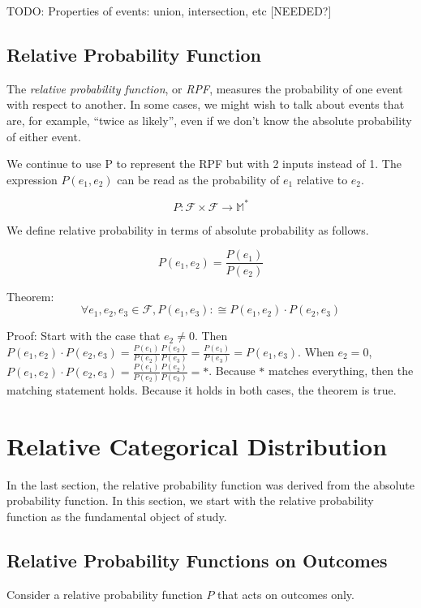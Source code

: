 \documentclass[twoside]{article}
\newcommand{\quotes}[1]{``#1''}
\begin{document}
TODO: Properties of events: union, intersection, etc [NEEDED?]

\subsection{Relative Probability Function}

The \textit{relative probability function}, or \textit{RPF}, measures the probability of one event with respect to another. In some cases, we might wish to talk about events that are, for example, \quotes{twice as likely}, even if we don't know the absolute probability of either event.

We continue to use P to represent the RPF but with 2 inputs instead of 1. The expression \(P(e_1, e_2)\) can be read as the probability of \(e_1\) relative to \(e_2\).

\[P: \mathcal{F} \times \mathcal{F} \rightarrow \mathbb{M}^*\]

We define relative probability in terms of absolute probability as follows.

\[P(e_1, e_2) = \frac{P(e_1)}{P(e_2)}\]

Theorem: \[\forall e_1, e_2, e_3 \in \mathcal{F}, P(e_1, e_3) :\cong P(e_1, e_2) \cdot P(e_2, e_3)\]

Proof: Start with the case that \(e_2 \neq 0\). Then \(P(e_1, e_2) \cdot P(e_2, e_3) = \frac{P(e_1)}{P(e_2)}\frac{P(e_2)}{P(e_3)} = \frac{P(e_1)}{P(e_3)} = P(e_1, e_3)\). When \(e_2 = 0\), \(P(e_1, e_2) \cdot P(e_2, e_3) = \frac{P(e_1)}{P(e_2)}\frac{P(e_2)}{P(e_3)} = \ast\). Because \(\ast\) matches everything, then the matching statement holds. Because it holds in both cases, the theorem is true.

\section{Relative Categorical Distribution}

In the last section, the relative probability function was derived from the absolute probability function. In this section, we start with the relative probability function as the fundamental object of study.

\subsection{Relative Probability Functions on Outcomes}

Consider a relative probability function \(P\) that acts on outcomes only.
\end{document}
